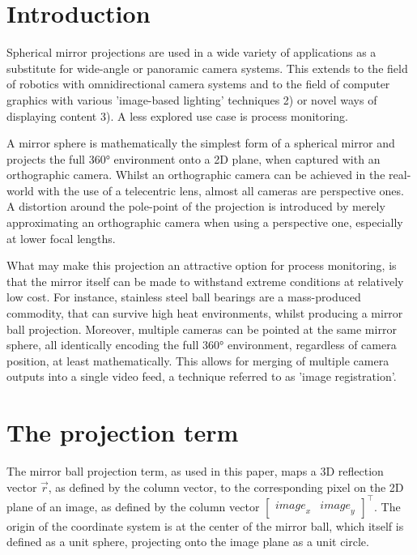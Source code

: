 \documentclass[10pt]{article}
\begin{document}
\begin{multicols}{2}
\section{Introduction}
Spherical mirror projections are used in a wide variety of applications as a substitute for wide-angle or panoramic camera systems. This extends to the field of robotics with omnidirectional camera systems \cite{omnidirectional} and to the field of computer graphics with various 'image-based lighting' techniques 2) or novel ways of displaying content 3). A less explored use case is process monitoring.

A mirror sphere is mathematically the simplest form of a spherical mirror and projects the full 360° environment onto a 2D plane, when captured with an orthographic camera. Whilst an orthographic camera can be achieved in the real-world with the use of a telecentric lens, almost all cameras are perspective ones. A distortion around the pole-point of the projection is introduced by merely approximating an orthographic camera when using a perspective one, especially at lower focal lengths.

What may make this projection an attractive option for process monitoring, is that the mirror itself can be made to withstand extreme conditions at relatively low cost. For instance, stainless steel ball bearings are a mass-produced commodity, that can survive high heat environments, whilst producing a mirror ball projection. Moreover, multiple cameras can be pointed at the same mirror sphere, all identically encoding the full 360° environment, regardless of camera position, at least mathematically. This allows for merging of multiple camera outputs into a single video feed, a technique referred to as 'image registration'.

\section{The projection term}
The mirror ball projection term, as used in this paper, maps a 3D reflection vector $\vec{r}$, as defined by the column vector, to the corresponding pixel on the 2D plane of an image, as defined by the column vector $\begin{bmatrix} {image}_x & {image}_y \end{bmatrix}^\intercal$. The origin of the coordinate system is at the center of the mirror ball, which itself is defined as a unit sphere, projecting onto the image plane as a unit circle. 


\end{multicols}
\end{document}
